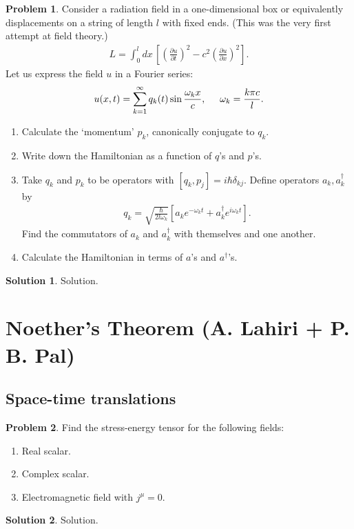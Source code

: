 \documentclass{book}
\numberwithin{equation}{section}
\theoremstyle{definition}
\newtheorem{prob}{Problem}[section]
\newtheorem{sln}{Solution}[section]
\newcommand{\p}{\partial}
\begin{document}
\begin{prob}
	Consider a radiation field in a one-dimensional box or equivalently displacements on a string of length $l$ with fixed ends. (This was the very first attempt at field theory.)
	\begin{align}
	L = \int^l_0 dx\, \left[\left(\frac{\p u}{\p t}\right)^2 - c^2\left(\frac{\p u}{\p x}\right)^2\right].
	\end{align}
	Let us express the field $u$ in a Fourier series:
	\begin{align}
	u(x,t) = \sum^\infty_{k=1}q_k(t)\sin\frac{\omega_k x}{c},\hspace{0.5cm} \omega_k = \frac{k\pi c}{l}.
	\end{align}
	\begin{enumerate}
		\item Calculate the `momentum' $p_k$, canonically conjugate to $q_k$.
		\item Write down the Hamiltonian as a function of $q$'s and $p$'s.
		\item Take $q_k$ and $p_k$ to be operators with $[q_k,p_j] = i\hbar \delta_{kj}$. Define operators $a_k, a_k^\dagger$ by
		\begin{align}
		q_k = \sqrt{\frac{\hbar}{2l\omega_k}}\left[ a_k e^{-\omega_k t} + a_k^\dagger e^{i \omega_k t} \right].
		\end{align}
		Find the commutators of $a_k$ and $a_k^\dagger$ with themselves and one another. 
		\item Calculate the Hamiltonian in terms of $a$'s and $a^\dagger$'s.
	\end{enumerate}


	\begin{sln}
		Solution.
	\end{sln}
\end{prob}









\newpage

\section{Noether's Theorem (A. Lahiri + P. B. Pal)}

\subsection{Space-time translations}
\begin{prob}
	Find the stress-energy tensor for the following fields:
	\begin{enumerate}
		\item Real scalar.
		\item Complex scalar.
		\item Electromagnetic field with $j^\mu = 0$.
	\end{enumerate}
	
	\begin{sln}
		Solution.
	\end{sln}
\end{prob}
\end{document}
